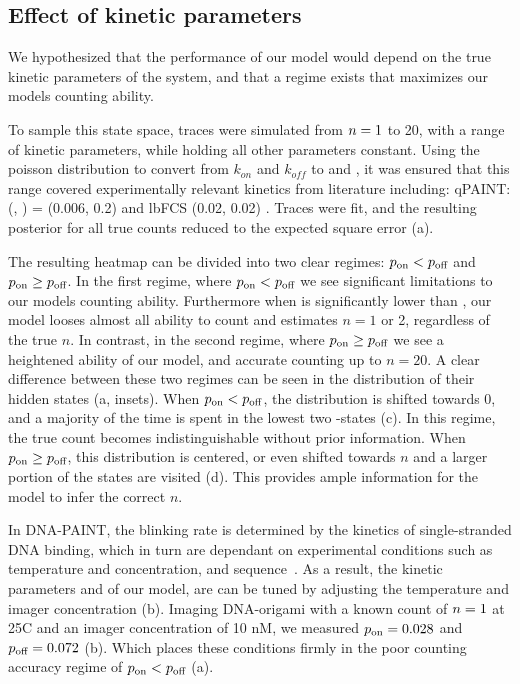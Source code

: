 \subsection{Effect of kinetic parameters}
We hypothesized that the performance of our model would depend on the true kinetic parameters of the system, 
and that a regime exists that maximizes our models counting ability.

To sample this state space, traces were simulated from $n=1$ to 20, with a range of kinetic parameters, 
while holding all other parameters constant.
	Using the poisson distribution to convert from $k_{on}$ and $k_{off}$ to \pon and \poff,
	it was ensured that this range covered experimentally relevant kinetics from literature including:
	qPAINT: (\pon, \poff) = (0.006, 0.2) \cite{jungmann_2016} and lbFCS (0.02, 0.02) \cite{stein_2021}. 
	Traces were fit, and the resulting posterior for all true counts reduced to the expected 
	square error (a).

The resulting heatmap can be divided into two clear regimes: $p_\text{on} < p_\text{off}$ and $p_\text{on} \geq p_\text{off}$.
	In the first regime, where $p_\text{on} < p_\text{off}$ we see significant limitations to our models counting ability.
	Furthermore when \pon is significantly lower than \poff, our model looses almost 
	all ability to count and estimates $n=1$ or 2, regardless of the true $n$.
	In contrast, in the second regime, where $p_\text{on} \geq p_\text{off}$ we see a heightened ability of our model, 
	and accurate counting up to $n=20$.
	A clear difference between these two regimes can be seen in the distribution 
	of their hidden states \z{} (a, insets).
	When $p_\text{on} < p_\text{off}$, the distribution is shifted towards 0, and a majority 
	of the time is spent in the lowest two \z{}-states (c). 
	In this regime, the true count becomes indistinguishable without prior information. 
	When $p_\text{on} \geq p_\text{off}$, this distribution is centered, or even shifted towards $n$ 
	and a larger portion of the states are visited (d). 
	This provides ample information for the model to infer the correct $n$.
	
In DNA-PAINT, the blinking rate is determined by the kinetics of single-stranded DNA binding,
which in turn are dependant on experimental conditions such as temperature and concentration, 
and sequence~\citep{jungmann_single-molecule_2010}.
	As a result, the kinetic parameters \pon and \poff of our model, are can be 
	tuned by adjusting the temperature and imager concentration (b).
	Imaging DNA-origami with a known count of $n=1$ at 25\textdegree C and an 
	imager concentration of 10 nM, we measured $p_\text{on}=0.028$ and $p_\text{off}=0.072$ 
	(b).
	Which places these conditions firmly in the poor counting 
	accuracy regime of $p_\text{on} < p_\text{off}$ (a). %
	
